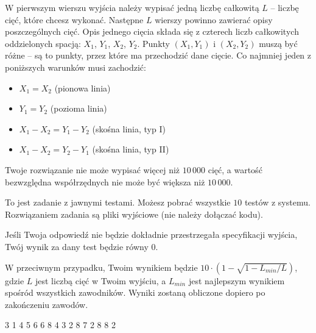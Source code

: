 W pierwszym wierszu wyjścia należy wypisać jedną liczbę całkowitą $L$ -- liczbę cięć, które chcesz wykonać.
Następne $L$ wierszy powinno zawierać opisy poszczególnych cięć.
Opis jednego cięcia składa się z czterech liczb całkowitych oddzielonych spacją: $X_1$, $Y_1$, $X_2$, $Y_2$.
Punkty $(X_1, Y_1)$ i $(X_2, Y_2)$ muszą być różne -- są to punkty, przez które ma przechodzić dane cięcie.
Co najmniej jeden z poniższych warunków musi zachodzić:
\begin{itemize}
	\item $X_1 = X_2$ (pionowa linia)
	\item $Y_1 = Y_2$ (pozioma linia)
	\item $X_1 - X_2 = Y_1 - Y_2$ (skośna linia, typ I)
	\item $X_1 - X_2 = Y_2 - Y_1$ (skośna linia, typ II)
\end{itemize}
Twoje rozwiązanie nie może wypisać więcej niż $10\,000$ cięć,
	a wartość bezwzględna współrzędnych nie może być większa niż $10\,000$.


To jest zadanie z jawnymi testami.
Możesz pobrać wszystkie $10$ testów z systemu.
Rozwiązaniem zadania są pliki wyjściowe (nie należy dołączać kodu).

Jeśli Twoja odpowiedź nie będzie dokładnie przestrzegała specyfikacji wyjścia,
	Twój wynik za dany test będzie równy $0$.

W przeciwnym przypadku, Twoim wynikiem będzie $10 \cdot \left(1 - \sqrt{1 - L_{min} / L} \right)$,
	gdzie $L$ jest liczbą cięć w Twoim wyjściu, a $L_{min}$ jest najlepszym wynikiem spośród wszystkich zawodników.
Wyniki zostaną obliczone dopiero po zakończeniu zawodów.

\newpage


3 1
4 5
6 6
8 4
3 2 8 7
2 8 8 2
\sampleEND


